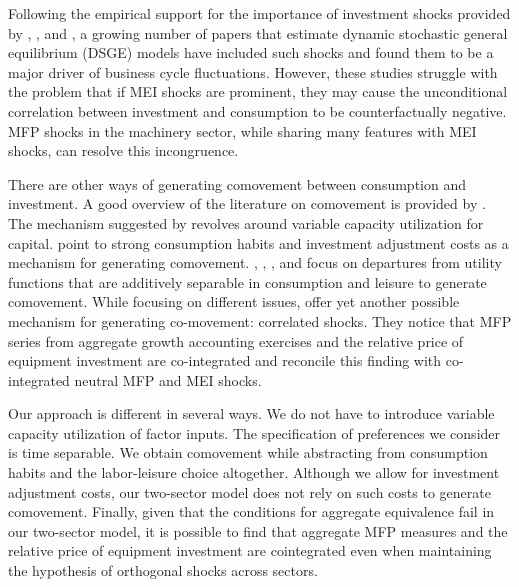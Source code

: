 \documentclass[12pt,fleqn]{article}
\begin{document}
Following the empirical support for the importance of investment shocks provided by , , and , a growing number of papers that estimate dynamic stochastic general equilibrium (DSGE) models have included such shocks and found them to be a major driver of business cycle
fluctuations. However, these studies struggle with the problem that if MEI shocks are
prominent, they may cause the unconditional correlation between investment and consumption
to be counterfactually negative. MFP shocks
in the machinery sector, while sharing many features with MEI shocks, can resolve this
incongruence.

There are other ways of generating comovement between
consumption and investment. A good overview of the literature on
comovement is provided by . The mechanism suggested by
 revolves around variable capacity
utilization for capital.  point to strong
consumption habits and investment adjustment costs as a mechanism
for generating comovement. ,
, ,  and
 focus on departures from utility
functions that are additively separable in consumption and leisure
to generate comovement. While focusing on different issues,
 offer yet another possible mechanism for
generating co-movement: correlated shocks. They notice that MFP
series from aggregate growth accounting exercises and the relative
price of equipment investment are co-integrated and reconcile this
finding with co-integrated neutral MFP and MEI shocks.

Our approach is different in several ways. We do not
have to introduce variable capacity utilization of factor inputs. The specification of preferences we consider is time separable.
We obtain comovement while abstracting from consumption habits and the labor-leisure choice
altogether. Although we allow for investment
adjustment costs, our two-sector model does not rely on such costs
to generate comovement. Finally, given that the conditions for
aggregate equivalence fail in our two-sector model, it is possible to find
that aggregate MFP measures and the relative price of equipment
investment are cointegrated even when maintaining the hypothesis
of orthogonal shocks across sectors.
\end{document}
